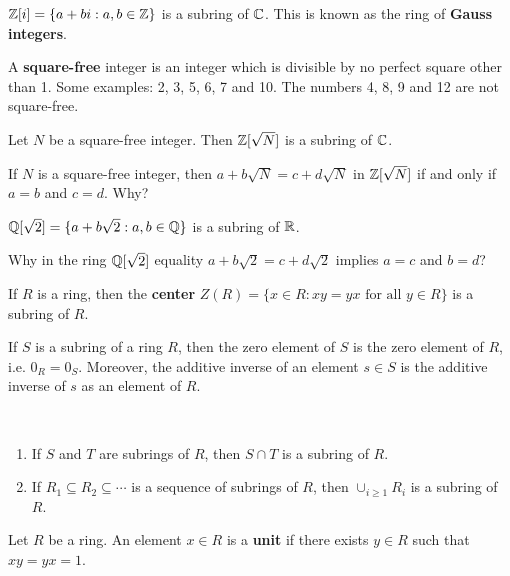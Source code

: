 \begin{example}
    $\mathbb{Z}[i]=\{a+bi:a,b\in\mathbb{Z}\}$ is a subring of $\mathbb{C}$. 
    This is known as the ring of \textbf{Gauss integers}.  
\end{example}

A \textbf{square-free} integer is an integer which is divisible by 
no perfect square other than 1. Some examples: 2, 3, 5, 6, 7 and 10. 
The numbers 4, 8, 9 and 12 are not square-free. 

\begin{example}
	Let $N$ be a square-free integer. Then $\mathbb{Z}[\sqrt{N}]$ is
	a subring of $\mathbb{C}$.  	
\end{example}

If $N$ is a square-free integer, then 
$a+b\sqrt{N}=c+d\sqrt{N}$ in $\mathbb{Z}[\sqrt{N}]$ 
if and only if $a=b$ and $c=d$. Why?

\begin{example}
    $\mathbb{Q}[\sqrt{2}]=\{a+b\sqrt{2}:a,b\in\mathbb{Q}\}$ is a subring of $\mathbb{R}$. 
\end{example}

Why in the ring $\mathbb{Q}[\sqrt{2}]$ 
equality $a+b\sqrt{2}=c+d\sqrt{2}$ implies $a=c$ and $b=d$?


\begin{example}
    If $R$ is a ring, then the \textbf{center} 
    $Z(R)=\{x\in R:xy=yx\text{ for all $y\in R$}\}$ 
    is a subring of $R$. 
\end{example}

If $S$ is a subring of a ring $R$, then the zero element 
of $S$ is the zero element of $R$, i.e. $0_R=0_S$. Moreover, 
the additive inverse of an element $s\in S$ 
is the additive inverse of $s$ as an element of $R$. 	

\begin{exercise}\
\begin{enumerate}
	\item If $S$ and $T$ are subrings of $R$, then $S\cap T$ is a subring of $R$.
	\item If $R_1\subseteq R_2\subseteq\cdots$ is a sequence of subrings of $R$, then 
	$\cup_{i\geq1}R_i$ is a subring of $R$. 
\end{enumerate}
\end{exercise}

\begin{definition}
	Let $R$ be a ring. An element $x\in R$ is 
	a \textbf{unit} if there exists $y\in R$ such that $xy=yx=1$. 
\end{definition}

